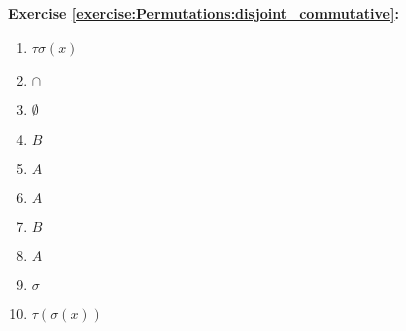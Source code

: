 \noindent\textbf{Exercise \ref{exercise:Permutations:disjoint_commutative}:}
%
\begin{multicols}{5}
\begin{enumerate}
\item
$\tau\sigma(x)$

\item
%
$\cap$

\item
$\emptyset$

\item
$B$


\item
$A$

\item
$A$

\item
$B$

\item
%
$A$

\item
$\sigma$

\item
$\tau(\sigma(x))$


\end{enumerate}
\end{multicols}
